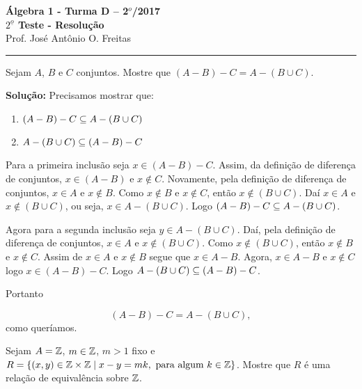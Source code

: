 \documentclass[12pt]{article}
\begin{document}


\begin{center}
{\Large\bf {\'A}lgebra 1 - Turma D -- 2$^{o}$/2017} \\ \vspace{9pt} {\large\bf
  $2^{\underline{o}}$ Teste - Resolu\c{c}\~ao}\\
\vspace{9pt} Prof. Jos{\'e} Ant{\^o}nio O. Freitas
\end{center}
\hrule

\vspace{.6cm}

\questao Sejam $A$, $B$ e $C$ conjuntos. Mostre que $(A - B) - C = A - (B \cup C)$.

\noindent\textbf{Solu\c{c}\~ao:} Precisamos mostrar que:
\begin{enumerate}[label={\roman*})]
	\item $(A - B) - C \subseteq A - (B \cup C)$
	\item $A - (B \cup C) \subseteq (A - B) - C$
\end{enumerate}

Para a primeira inclusão seja $x \in (A - B) - C$. Assim, da definição de diferença de conjuntos, $x \in (A - B)$ e $x \notin C$. Novamente, pela definição de diferença de conjuntos, $x \in A$ e $x \notin B$. Como $x \notin B$ e $x \notin C$, então $x \notin (B \cup C)$. Daí $x \in A$ e $x \notin (B \cup C)$, ou seja, $x \in A - (B \cup C)$. Logo $(A - B) - C \subseteq A - (B \cup C)$.

Agora para a segunda inclusão seja $y \in A - (B \cup C)$. Daí, pela definição de diferença de conjuntos, $x \in A$ e $x \notin (B \cup C)$. Como $x \notin (B \cup C)$, então $x \notin B$ e $x \notin C$. Assim de $x \in A$ e $x \notin B$ segue que $x \in A - B$. Agora, $x \in A - B$ e $x \notin C$ logo $x \in (A - B) - C$. Logo $A - (B \cup C) \subseteq (A - B) - C$.

Portanto

\[
	(A - B) - C = A - (B \cup C),
\]
como queríamos.

\vspace{.5cm}

\questao Sejam $A = \mathbb{Z}$, $m \in \mathbb{Z}$, $m > 1$ fixo e $R = \{(x,y)\in \mathbb{Z} \times \mathbb{Z} \mid x - y = mk, \mbox{ para algum } k \in \mathbb{Z}\}$. Mostre que $R$
é uma rela{\c c}{\~a}o de equival{\^e}ncia sobre $\mathbb{Z}$.
\end{document}
